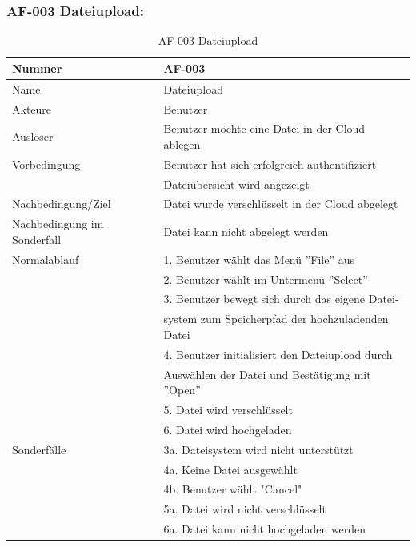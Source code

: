 \documentclass[13pt,a4paper,bibliography=totocnumbered,listof=totocnumbered]{scrartcl}
\begin{document}
\subsubsection{AF-003 Dateiupload:}
\begin{table}[!h]
	\centering
	\begin{tabular}{|l|l|}
		\hline
		Nummer & AF-003\\
		\hline
		Name & Dateiupload\\
		\hline
		Akteure & Benutzer\\
		\hline
		Auslöser & Benutzer möchte eine Datei in der Cloud ablegen\\
		\hline
		Vorbedingung & Benutzer hat sich erfolgreich authentifiziert \\ & Dateiübersicht wird angezeigt\\
		\hline
		Nachbedingung/Ziel & Datei wurde verschlüsselt in der Cloud abgelegt \\
		\hline
		Nachbedingung im Sonderfall & Datei kann nicht abgelegt werden\\
		\hline
		Normalablauf & 1. Benutzer wählt das Menü ''File'' aus \\ & 2. Benutzer wählt im Untermenü ''Select'' \\ & 3. Benutzer bewegt sich durch das eigene  Datei- \\ & system zum Speicherpfad der hochzuladenden Datei \\ & 4. Benutzer initialisiert den Dateiupload durch \\ &  Auswählen der Datei und Bestätigung mit ''Open'' \\  & 5. Datei wird verschlüsselt \\ & 6. Datei wird hochgeladen \\
		\hline
		Sonderfälle & 3a. Dateisystem wird nicht unterstützt \\& 4a. Keine Datei ausgewählt \\ & 4b. Benutzer wählt "Cancel" \\ &  5a. Datei wird nicht verschlüsselt \\ & 6a. Datei kann nicht hochgeladen werden\\
		\hline
	\end{tabular}
	\caption{AF-003 Dateiupload}
	\label{tab:AF-003 Dateiupload}
\end{table}
\pagebreak
\end{document}

